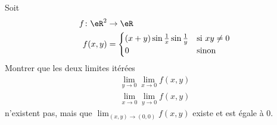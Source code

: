 \begin{exercice}[\minsyndical]\label{exoLimiteContinue0004}

Soit 
\begin{equation}
	\begin{aligned}
		f\colon \eR^2&\to \eR \\
		f(x,y)&=
		\begin{cases}
			(x+y)\sin\frac{1}{ x }\sin\frac{1}{ y }	&	\text{si }xy\neq 0\\
			0	&	 \text{sinon}
		\end{cases}
	\end{aligned}
\end{equation}
Montrer que  les deux limites itérées 
\begin{subequations}
	\begin{align}
		\lim_{y\to 0}\lim_{x\to 0}f(x,y)\\
		\lim_{x\to 0}\lim_{y\to 0}f(x,y) 
	\end{align}
\end{subequations}
n'existent pas, mais que
$\lim_{(x,y)\to (0,0)}f(x,y)$ 
existe et est égale à $0$.

\end{exercice}
